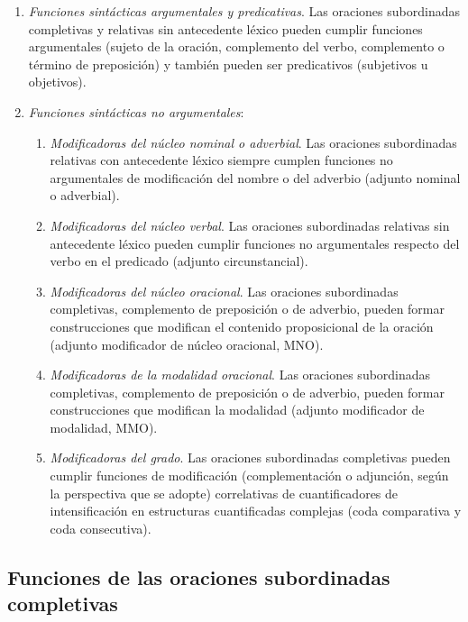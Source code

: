 \begin{enumerate}[label=(\alph*)]
  \item \textit{Funciones sintácticas argumentales y predicativas}. Las oraciones
        subordinadas completivas y relativas sin antecedente léxico pueden
        cumplir funciones argumentales (sujeto de la oración, complemento del
        verbo, complemento o término de preposición) y también pueden ser
        predicativos (subjetivos u objetivos).
  \item \textit{Funciones sintácticas no argumentales}:
        \begin{enumerate}[label=(b.\arabic*)]
          \item \textit{Modificadoras del núcleo nominal o adverbial}. Las
                oraciones subordinadas relativas con antecedente léxico siempre
                cumplen funciones no argumentales de modificación del nombre o
                del adverbio (adjunto nominal o adverbial).
          \item \textit{Modificadoras del núcleo verbal}. Las oraciones
                subordinadas relativas sin antecedente léxico pueden cumplir
                funciones no argumentales respecto del verbo en el predicado
                (adjunto circunstancial).
          \item \textit{Modificadoras del núcleo oracional}. Las oraciones
                subordinadas completivas, complemento de preposición o de
                adverbio, pueden formar construcciones que modifican el
                contenido proposicional de la oración (adjunto modificador de
                núcleo oracional, MNO).
          \item \textit{Modificadoras de la modalidad oracional}. Las oraciones
                subordinadas completivas, complemento de preposición o de
                adverbio, pueden formar construcciones que modifican la
                modalidad (adjunto modificador de modalidad, MMO).
          \item \textit{Modificadoras del grado}. Las oraciones subordinadas
                completivas pueden cumplir funciones de modificación
                (complementación o adjunción, según la perspectiva que se adopte)
                correlativas de cuantificadores de intensificación en estructuras
                cuantificadas complejas (coda comparativa y coda consecutiva).
        \end{enumerate}
\end{enumerate}

\subsection{Funciones de las oraciones subordinadas completivas}\label{sec:13-completivas}


